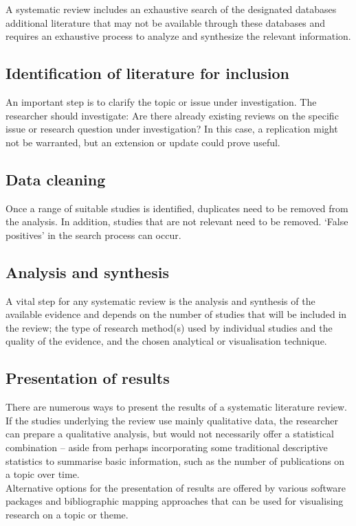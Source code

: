 \documentclass[letterpaper,10pt]{article}
\begin{document}
A systematic review includes an exhaustive search of the designated databases additional literature that may not be available through these databases and requires an exhaustive process to analyze and synthesize the relevant information.


\subsection{Identification of literature for inclusion}
An important step is to clarify the topic or issue under investigation. The researcher should investigate: Are there already existing reviews on the specific issue or research question under investigation? In this case, a replication might not be warranted, but an extension or update could prove useful.
\subsection{Data cleaning}
Once a range of suitable studies is identified, duplicates need to be removed from the analysis. In
addition, studies that are not relevant need to be removed. ‘False positives’ in the search process
can occur.


\subsection{Analysis and synthesis}

A vital step for any systematic review is the analysis and synthesis of the available evidence and depends on the number of studies that will be included in the review; the type of research method(s) used by individual studies and the quality of the evidence, and the chosen analytical or visualisation technique.


\subsection{Presentation of results}
There are numerous ways to present the results of a systematic literature review. If the studies
underlying the review use mainly qualitative data, the researcher can prepare a qualitative analysis,
but would not necessarily offer a statistical combination – aside from perhaps incorporating some
traditional descriptive statistics to summarise basic information, such as the
number of publications on a topic over time.\\

Alternative options for the presentation of results are offered by various software packages and
bibliographic mapping approaches that can be used for visualising research on a topic or theme.
\end{document}
